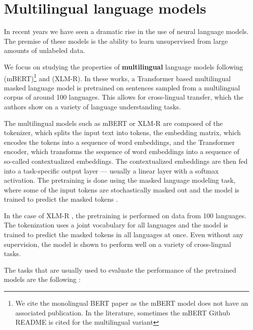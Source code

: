 
\section{Multilingual language models}

In recent years we have seen a dramatic rise in the use of neural language models. The premise of these models is the ability to learn unsupervised from large amounts of unlabeled data. 

We focus on studying the properties of \textbf{multilingual} language models following \citet{devlin_bert_2019} (mBERT)\footnote{We cite the monolingual BERT paper as the mBERT model does not have an associated publication. In the literature, sometimes the mBERT Github README is cited for the multilingual variant\cite{devlin_bertmultilingualmd_2019}} and \citet{conneau_unsupervised_2020} (XLM-R). In these works, a Transformer \cite{vaswani_attention_nodate} based multilingual masked language model is pretrained on sentences sampled from a multilingual corpus of around 100 languages. This allows for cross-lingual transfer, which the authors show on a variety of language understanding tasks.

The multilingual models such as mBERT or XLM-R are composed of the tokenizer, which splits the input text into tokens, the embedding matrix, which encodes the tokens into a sequence of word embeddings, and the Transformer encoder, which transforms the sequence of word embeddings into a sequence of so-called contextualized embeddings. The contextualized embeddings are then fed into a task-specific output layer --- usually a linear layer with a softmax activation. The pretraining is done using the masked language modeling task, where some of the input tokens are stochastically masked out and the model is trained to predict the masked tokens \cite{devlin_bert_2019}.

In the case of XLM-R \cite{conneau_unsupervised_2020}, the pretraining is performed on data from 100 languages. The tokenization uses a joint vocabulary for all languages and the model is trained to predict the masked tokens in all languages at once. Even without any supervision, the model is shown to perform well on a variety of cross-lingual tasks.

The tasks that are usually used to evaluate the performance of the pretrained models are the following \cite{ruder_xtreme-r_2021}:

